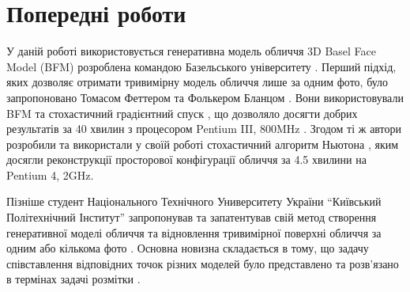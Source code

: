 \section{Попередні роботи}

У даній роботі використовується генеративна модель обличчя
3D Basel Face Model (BFM)
розроблена командою Базельського університету
\cite{bfm09}.
Перший підхід,
яких дозволяє отримати тривимірну модель обличчя лише за одним фото,
було запропоновано Томасом Феттером та Фолькером Бланцом
\cite{blanz:vetter:1999}.
Вони використовували BFM та стохастичний градієнтний спуск \cite{sgd:1998},
що дозволяло досягти добрих результатів за 40 хвилин з процесором
Pentium III, 800MHz \cite{blanz:romdhani:vetter}.
Згодом ті ж автори розробили та використали у своїй роботі
стохастичний алгоритм Ньютона \cite{blanz:vetter:2003},
яким досягли реконструкції просторової конфігурації обличчя за 4.5 хвилини на
Pentium 4, 2GHz.

Пізніше студент Національного Технічного Университету України
``Київський Політехнічний Інститут'' запропонував та запатентував
свій метод створення генеративної моделі обличчя та відновлення
тривимірної поверхні обличчя за одним або кількома фото \cite{tyshchenko2011}.
Основна новизна складається в тому,
що задачу співставлення відповідних точок різних моделей
було представлено та розв'язано в термінах задачі розмітки
\cite{Rossi:2006:HCP:1207782}.
